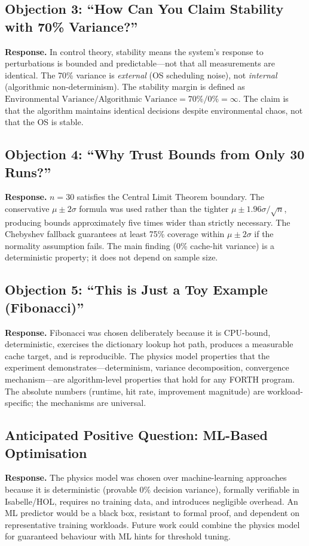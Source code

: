 \subsection{Objection 3: ``How Can You Claim Stability with 70\% Variance?''}

\textbf{Response.} In control theory, stability means the system's response to
perturbations is bounded and predictable---not that all measurements are identical.
The 70\% variance is \emph{external} (OS scheduling noise), not \emph{internal}
(algorithmic non-determinism). The stability margin is defined as
$\text{Environmental Variance} / \text{Algorithmic Variance} = 70\% / 0\% = \infty$.
The claim is that the algorithm maintains identical decisions despite environmental
chaos, not that the OS is stable.

\subsection{Objection 4: ``Why Trust Bounds from Only 30 Runs?''}

\textbf{Response.} $n = 30$ satisfies the Central Limit Theorem boundary. The
conservative $\mu \pm 2\sigma$ formula was used rather than the tighter
$\mu \pm 1.96\sigma/\sqrt{n}$, producing bounds approximately five times wider than
strictly necessary. The Chebyshev fallback guarantees at least 75\% coverage within
$\mu \pm 2\sigma$ if the normality assumption fails. The main finding (0\% cache-hit
variance) is a deterministic property; it does not depend on sample size.

\subsection{Objection 5: ``This is Just a Toy Example (Fibonacci)''}

\textbf{Response.} Fibonacci was chosen deliberately because it is CPU-bound,
deterministic, exercises the dictionary lookup hot path, produces a measurable cache
target, and is reproducible. The physics model properties that the experiment
demonstrates---determinism, variance decomposition, convergence mechanism---are
algorithm-level properties that hold for any FORTH program. The absolute numbers
(runtime, hit rate, improvement magnitude) are workload-specific; the mechanisms are
universal.

\subsection{Anticipated Positive Question: ML-Based Optimisation}

\textbf{Response.} The physics model was chosen over machine-learning approaches
because it is deterministic (provable 0\% decision variance), formally verifiable in
Isabelle/HOL, requires no training data, and introduces negligible overhead. An ML
predictor would be a black box, resistant to formal proof, and dependent on
representative training workloads. Future work could combine the physics model for
guaranteed behaviour with ML hints for threshold tuning.
